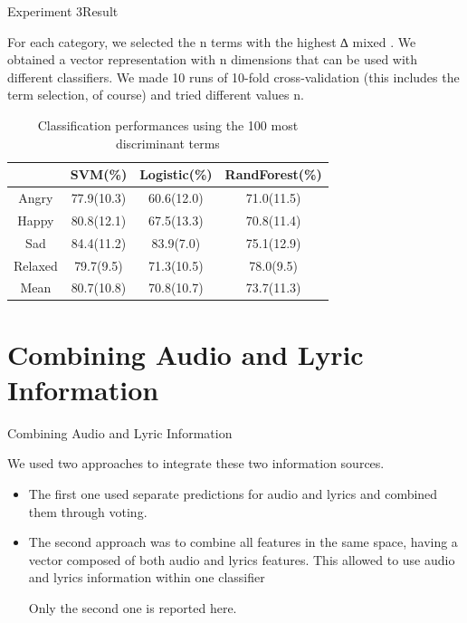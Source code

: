 \documentclass{beamer}
\begin{document}
\begin{frame}{Experiment 3}{Result}

{\tiny For each category, we selected the n terms with the highest ∆ mixed . We obtained a vector representation with n dimensions that can be used with different classifiers. We made 10 runs of 10-fold cross-validation (this includes the term selection, of course) and tried different values n.}
	\begin{table}[tbh]
		\centering
		
		\begin{tabular}{|c|c|c|c|}
		\hline
		        & SVM(\%) & Logistic(\%) & RandForest(\%) \\ \hline
		  Angry & 77.9(10.3) & 60.6(12.0) & 71.0(11.5) \\ %
		  Happy & 80.8(12.1) & 67.5(13.3) & 70.8(11.4) \\ %
		  Sad & 84.4(11.2) & 83.9(7.0) & 75.1(12.9) \\ %
		  Relaxed & 79.7(9.5) & 71.3(10.5) & 78.0(9.5) \\ \hline
		  Mean & 80.7(10.8) & 70.8(10.7) & 73.7(11.3) \\ \hline
		\end{tabular}
		\caption{Classification performances using the 100 most discriminant terms}
	\end{table} 
\end{frame}



\section{Combining Audio and Lyric Information}

\begin{frame}{Combining Audio and Lyric Information}

We used two approaches to integrate these two information sources.

\begin{itemize}
\item
{
	The first one used separate predictions for
audio and lyrics and combined them through voting.
	
}
\item
{
	The second approach was to combine all features in the same space, having a vector composed of both audio and lyrics features. This allowed to use audio and lyrics information within one classifier
	
}

Only the second one is reported here.
\end{itemize}

\end{frame}
\end{document}
